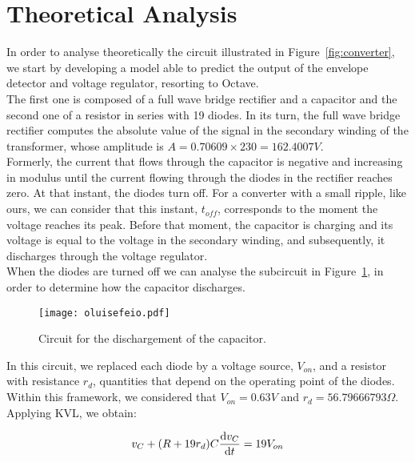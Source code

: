 \section{Theoretical Analysis}
\label{sec:analysis}

In order to analyse theoretically the circuit illustrated in Figure~\ref{fig:converter}, we start by developing a model able to predict the output of the envelope detector and voltage regulator, resorting to Octave. \\

The first one is composed of a full wave bridge rectifier and a capacitor and the second one of a resistor in series with 19 diodes. In its turn, the full wave bridge rectifier computes the absolute value of the signal in the secondary winding of the transformer, whose amplitude is $A=0.70609 \times 230=162.4007V$. \\

Formerly, the current that flows through the capacitor is negative and increasing in modulus until the current flowing through the diodes in the rectifier reaches zero. At that instant, the diodes turn off. For a converter with a small ripple, like ours, we can consider that this instant, $t_{off}$, corresponds to the moment the voltage reaches its peak. Before that moment, the capacitor is charging and its voltage is equal to the voltage in the secondary winding, and subsequently, it discharges through the voltage regulator.\\

When the diodes are turned off we can analyse the subcircuit in Figure~\ref{fig:oluisefeio}, in order to determine how the capacitor discharges.

\begin{figure}[H] \centering
\texttt{[image: oluisefeio.pdf]}
\caption{Circuit for the dischargement of the capacitor.}
\label{fig:oluisefeio}
\end{figure}

In this circuit, we replaced each diode by a voltage source, $V_{on}$, and a resistor with resistance $r_d$, quantities that depend on the operating point of the diodes. Within this framework, we considered that $V_{on} = 0.63V$ and $r_d = 56.79666793 \Omega$.\\

Applying KVL, we obtain:

\begin{equation}
v_C + (R+19 r_d) C \odv{v_C}{t} = 19V_{on}
\end{equation}

